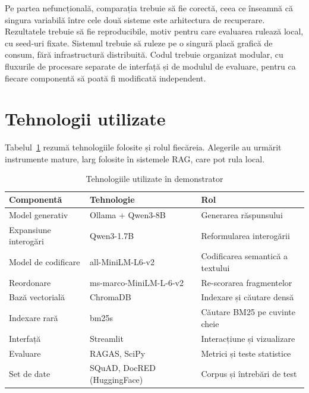 Pe partea nefuncțională, comparația trebuie să fie corectă, ceea ce înseamnă că singura variabilă între cele două sisteme este arhitectura de recuperare. Rezultatele trebuie să fie reproducibile, motiv pentru care evaluarea rulează local, cu seed-uri fixate. Sistemul trebuie să ruleze pe o singură placă grafică de consum, fără infrastructură distribuită. Codul trebuie organizat modular, cu fluxurile de procesare separate de interfață și de modulul de evaluare, pentru ca fiecare componentă să poată fi modificată independent.

\section{Tehnologii utilizate}

Tabelul~\ref{tab:tehnologii} rezumă tehnologiile folosite și rolul fiecăreia. Alegerile au urmărit instrumente mature, larg folosite în sistemele RAG, care pot rula local.

\begin{table}[ht]
\centering
\small
\begin{tabular}{lll}
\toprule
\textbf{Componentă} & \textbf{Tehnologie} & \textbf{Rol} \\
\midrule
Model generativ      & Ollama + Qwen3-8B            & Generarea răspunsului \\
Expansiune interogări & Qwen3-1.7B                  & Reformularea interogării \\
Model de codificare  & all-MiniLM-L6-v2            & Codificarea semantică a textului \\
Reordonare           & ms-marco-MiniLM-L-6-v2      & Re-scorarea fragmentelor \\
Bază vectorială      & ChromaDB                    & Indexare și căutare densă \\
Indexare rară        & bm25s                       & Căutare BM25 pe cuvinte cheie \\
Interfață            & Streamlit                   & Interacțiune și vizualizare \\
Evaluare             & RAGAS, SciPy               & Metrici și teste statistice \\
Set de date          & SQuAD, DocRED (HuggingFace) & Corpus și întrebări de test \\
\bottomrule
\end{tabular}
\caption{Tehnologiile utilizate în demonstrator}
\label{tab:tehnologii}
\end{table}

